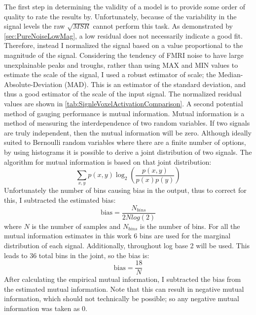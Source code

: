 The first step in determining the validity of a model is to provide some order of quality
to rate the results by. Unfortunately, because of the variability in the signal levels the
raw $\sqrt{MSR}$ cannot perform this task. As demonstrated by \autoref{sec:PureNoiseLowMag},
a low residual does not necessarily indicate a good fit. 
Therefore, instead I  normalized the signal based on a value proportional to
the magnitude of the signal. Considering the tendency of FMRI noise to have large unexplainable
peaks and troughs, rather than using MAX and MIN values to estimate the scale of the 
signal, I used a robust estimator of 
scale; the Median-Absolute-Deviation (MAD). This is an estimator of the standard
deviation, and thus a good estimator of the scale of the input signal. 
The normalized residual values are 
shown in \autoref{tab:SignleVoxelActivationComparison}. A second potential method of 
gauging performance is mutual information. Mutual information is a method of measuring
the interdependence of two random variables. If two signals are truly independent,
then the mutual information will be zero. Although ideally suited to Bernoulli 
random variables where there are a finite number of options, by using histograms
it is possible to derive a joint distribution of two signals. The algorithm for 
mutual information is based on that joint distribution:
\begin{equation}
\sum_{x,y} p(x,y) \log_2\left(\frac{p(x,y)}{p(x)p(y)}\right)
\end{equation}
Unfortunately the number of bins causing bias in the output, thus to correct for this,
I subtracted the estimated bias:
\begin{equation}
\text{bias} = \frac{N_{bins}}{2Nlog(2)}
\end{equation}
where $N$ is the number of samples and $N_{bins}$ is the number of bins. For all
the mutual information estimates in this work 6 bins are used for the marginal
distribution of each signal. Additionally, throughout log base 2 will be used.
This leads to 36 total bins in the joint, so the bias is: 
\begin{equation}
\text{bias} = \frac{18}{N}
\end{equation}
After calculating the empirical mutual information, I subtracted the bias from
the estimated mutual information. Note that this can result in negative mutual
information, which should not technically be possible; so any negative mutual information
was taken as 0.

